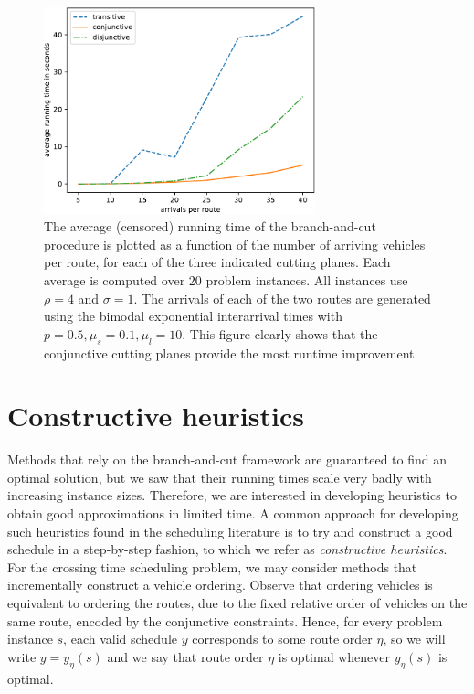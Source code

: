 \documentclass[a4paper]{article}
\theoremstyle{definition}
\theoremstyle{plain}
\begin{document}
\begin{figure}
  \centering
  \includegraphics[width=0.7\textwidth]{data-single/running_times.pdf}
  \caption{The average (censored) running time of the branch-and-cut procedure
    is plotted as a function of the number of arriving vehicles per route, for
    each of the three indicated cutting planes. Each average is computed over
    $20$ problem instances. All instances use $\rho = 4$ and $\sigma = 1$. The arrivals
    of each of the two routes are generated using the bimodal exponential
    interarrival times with $p=0.5, \mu_{s} = 0.1, \mu_{l} = 10$. This figure
    clearly shows that the conjunctive cutting planes provide the most runtime
    improvement.}
  \label{fig:running_time}
\end{figure}


\section{Constructive heuristics}

Methods that rely on the branch-and-cut framework are guaranteed to find an
optimal solution, but we saw that their running times scale very badly with
increasing instance sizes. Therefore, we are interested in developing heuristics
to obtain good approximations in limited time. A common approach for developing
such heuristics found in the scheduling literature is to try and construct a
good schedule in a step-by-step fashion, to which we refer as
\textit{constructive heuristics}. For the crossing time scheduling problem, we
may consider methods that incrementally construct a vehicle ordering.
%
Observe that ordering vehicles is equivalent to ordering the routes, due to the
fixed relative order of vehicles on the same route, encoded by the conjunctive
constraints. Hence, for every problem instance $s$, each valid schedule $y$
corresponds to some route order $\eta$, so we will write $y = y_{\eta}(s)$ and we
say that route order $\eta$ is optimal whenever $y_{\eta}(s)$ is optimal.
\end{document}
